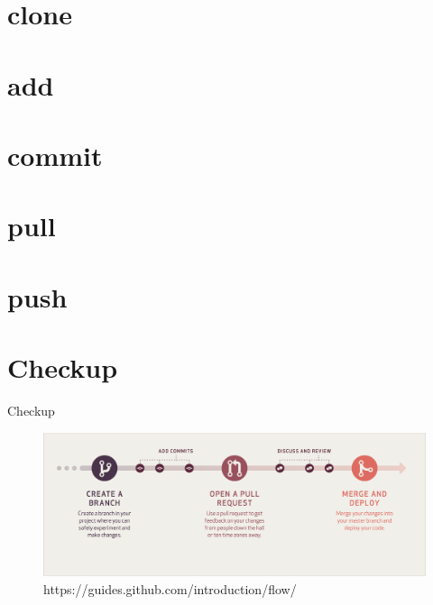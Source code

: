 \documentclass{beamer}
\begin{document}
\section{clone}

\section{add}

\section{commit}

\section{pull}

\section{push}

\section{Checkup}
\begin{frame}{Checkup}
    \begin{figure}
        \center
        \includegraphics[width=.9\textwidth]{git-workflow}
        \caption{https://guides.github.com/introduction/flow/}
        \label{fig:git-workflow}
    \end{figure}
\end{frame}
\end{document}
